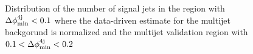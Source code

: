 \begin{figure}[h!]
\centering 
{}
\caption{Distribution of the number of signal jets in  the region with $\Delta\phi_{\rm{min}}^{4{\rm{j}}} < 0.1$ where the data-driven estimate for the multijet backgorund is normalized and  the multijet validation region with $0.1 < \Delta\phi_{\rm{min}}^{4{\rm{j}}} < 0.2$}\label{fig:jet_smear_jetn}
\end{figure} 


